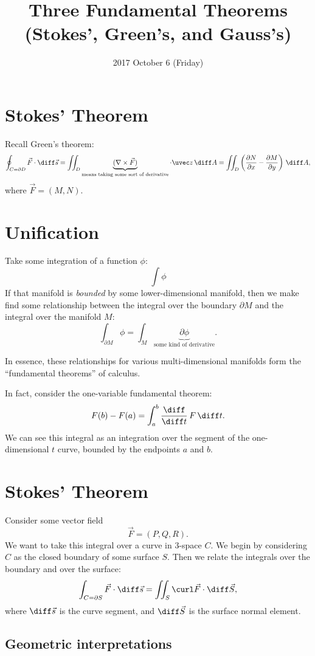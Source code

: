 \documentclass{multi}
\title{Three Fundamental Theorems (Stokes', Green's, and Gauss's)}
\date{2017 October 6 (Friday)}
\begin{document}
\section*{Stokes' Theorem}

Recall Green's theorem:
\[
    \oint_{C=\partial D} \vec F \cdot \diff \vec s = \iint_D \underbrace{(\nabla \times \vec F)}_\text{means taking some sort of derivative} \cdot \uvec z \, \diff A = \iint_D \left(\frac{\partial N}{\partial x} - \frac{\partial M}{\partial y}\right) \, \diff A,
\]
where \(\vec F = (M, N)\).

\section*{Unification}

Take some integration of a function \(\phi\):
\[
    \int \phi
\]
If that manifold is \emph{bounded} by some lower-dimensional manifold, then we make find some relationship between the integral over the boundary \(\partial M\) and the integral over the manifold \(M\):
\[
    \int_{\partial M} \phi = \int_M \underbrace{\partial \phi}_\text{some kind of derivative}.
\]

In essence, these relationships for various multi-dimensional manifolds form the ``fundamental theorems'' of calculus.

In fact, consider the one-variable fundamental theorem:
\[
    F(b) - F(a) = \int_a^b \frac{\diff}{\diff t} \, F \, \diff t.
\]
We can see this integral as an integration over the segment of the one-dimensional \(t\) curve, bounded by the endpoints \(a\) and \(b\).

\section*{Stokes' Theorem}

Consider some vector field
\[
    \vec F = (P, Q, R).
\]
We want to take this integral over a curve in \(3\)-space \(C\). We begin by considering \(C\) as the closed boundary of some surface \(S\). Then we relate the integrals over the boundary and over the surface:
\[
    \int_{C=\partial S} \vec F \cdot \diff \vec s = \iint_S \curl \vec F \cdot \diff \vec S,
\]
where \(\diff \vec s\) is the curve segment, and \(\diff \vec S\) is the surface normal element.

\subsection*{Geometric interpretations}
\end{document}
